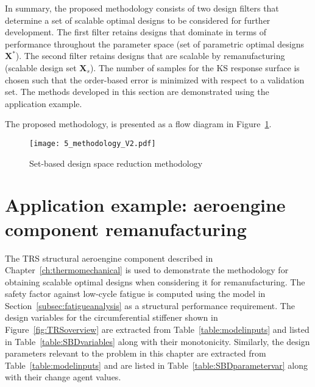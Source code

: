 In summary, the proposed methodology consists of two design filters that determine a set of scalable optimal designs to be considered for further development. The first filter retains designs that dominate in terms of performance throughout the parameter space (set of parametric optimal designs $\mathbf{X}^*$). The second filter retains designs that are scalable by remanufacturing (scalable design set $\mathbf{X}_s$). The number of samples for the \ac{KS} response surface is chosen such that the order-based error is minimized with respect to a validation set. The methods developed in this section are demonstrated using the application example.

The proposed methodology, is presented as a flow diagram in Figure~\ref{fig:SBDmethods}.

\begin{figure}[h]
	\centering
	\texttt{[image: 5\_methodology\_V2.pdf]}
	\caption{ \label{fig:SBDmethods} Set-based design space reduction methodology}
\end{figure}

\section{Application example: aeroengine component remanufacturing} \label{sec:SBDusecase}

The \ac{TRS} structural aeroengine component described in Chapter~\ref{ch:thermomechanical} is used to demonstrate the methodology for obtaining scalable optimal designs when considering it for remanufacturing. The safety factor against low-cycle fatigue is computed using the model in Section~\ref{subsec:fatigueanalysis} as a structural performance requirement. The design variables for the circumferential stiffener shown in Figure~\ref{fig:TRSoverview} are extracted from Table~\ref{table:modelinputs} and listed in Table~\ref{table:SBDvariables} along with their monotonicity. Similarly, the design parameters relevant to the problem in this chapter are extracted from Table~\ref{table:modelinputs} and are listed in Table~\ref{table:SBDparametervar} along with their change agent values.

